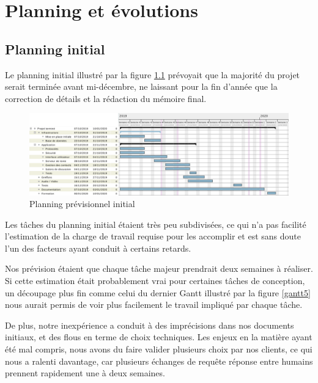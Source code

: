 \chapter{Planning et évolutions}



\section{Planning initial}

Le planning initial illustré par la figure \ref{gantt1}
prévoyait que la majorité du projet serait terminée avant
mi-décembre, ne laissant pour la fin d'année que la correction
de détails et la rédaction du mémoire final.

\begin{figure}[h]
  \caption{\label{gantt1} Planning prévisionnel initial}
  \includegraphics[width=15cm]{images/gantt01}
\end{figure}

Les tâches du planning initial étaient très peu subdivisées,
ce qui n'a pas facilité l'estimation de la charge de travail
requise pour les accomplir et est sans doute l'un des facteurs
ayant conduit à certains retards.

Nos prévision étaient que chaque tâche majeur prendrait deux
semaines à réaliser. Si cette estimation était probablement
vrai pour certaines tâches de conception, un découpage plus
fin comme celui du dernier Gantt illustré par la figure
\ref{gantt5} nous aurait permis de voir plus facilement le
travail impliqué par chaque tâche.

De plus, notre inexpérience a conduit à des imprécisions dans
nos documents initiaux, et des flous en terme de choix
techniques. Les enjeux en la matière ayant été mal compris,
nous avons du faire valider plusieurs choix par nos clients,
ce qui nous a ralenti davantage, car plusieurs échanges de
requête réponse entre humains prennent rapidement une à deux
semaines.

